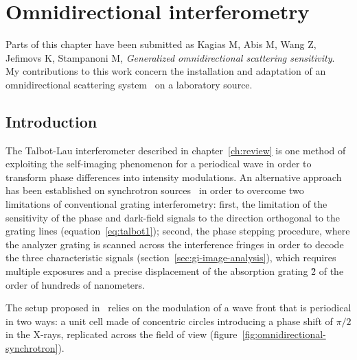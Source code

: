 \chapter{Omnidirectional interferometry}\label{ch:omnidirectional}
Parts of this chapter have been submitted as Kagias M, Abis M, Wang Z,
Jefimovs K, Stampanoni M,
\emph{Generalized omnidirectional scattering sensitivity}. My contributions
to this work concern the installation and adaptation of an omnidirectional scattering
system~\parencite{PhysRevLett.116.093902} on a laboratory source.

\section{Introduction}
The Talbot-Lau interferometer described in chapter~\ref{ch:review} is one
method of exploiting the self-imaging phenomenon for a periodical wave in
order to transform phase differences into intensity modulations.
An alternative approach has been established on synchrotron
sources~\parencite{PhysRevLett.116.093902} in order to overcome two limitations
of conventional grating interferometry: first, the limitation of the sensitivity of
the phase and dark-field signals to the direction orthogonal to the grating
lines (equation~\ref{eq:talbot1}); second, the phase stepping procedure, where
the analyzer grating is scanned across the interference fringes in order to
decode the three characteristic signals
(section~\ref{sec:gi-image-analysis}), which requires multiple exposures and
a precise displacement of the absorption grating \G2 of the order of
hundreds of nanometers.

The setup proposed in~\parencite{PhysRevLett.116.093902} relies on the modulation
of a wave front that is periodical in two ways: a unit cell made of
concentric circles introducing a phase shift of $\pi/2$ in the X-rays,
replicated across the field of view
(figure~\ref{fig:omnidirectional-synchrotron}).

